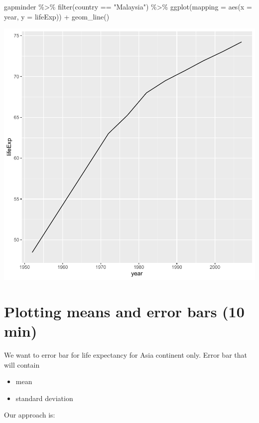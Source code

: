 \documentclass[
]{book}
\makeatletter
\newenvironment{Shaded}{\begin{snugshade}}{\end{snugshade}}
\newcommand{\AttributeTok}[1]{\textcolor[rgb]{0.61,0.61,0.61}{#1}}
\newcommand{\FunctionTok}[1]{\textcolor[rgb]{0,0,0}{#1}}
\newcommand{\NormalTok}[1]{#1}
\newcommand{\SpecialCharTok}[1]{\textcolor[rgb]{0,0,0}{#1}}
\newcommand{\StringTok}[1]{\textcolor[rgb]{0.5,0.5,0.5}{#1}}
\providecommand{\tightlist}{%
  \setlength{\itemsep}{0pt}\setlength{\parskip}{0pt}}
\newenvironment{kframe}{%
\medskip{}
\setlength{\fboxsep}{.8em}
 \def\at@end@of@kframe{}%
 \ifinner\ifhmode%
  \def\at@end@of@kframe{\end{minipage}}%
  \begin{minipage}{\columnwidth}%
 \fi\fi%
 \def\FrameCommand##1{\hskip\@totalleftmargin \hskip-\fboxsep
 \colorbox{shadecolor}{##1}\hskip-\fboxsep
     \hskip-\linewidth \hskip-\@totalleftmargin \hskip\columnwidth}%
 \MakeFramed {\advance\hsize-\width
   \@totalleftmargin\z@ \linewidth\hsize
   \@setminipage}}%
 {\par\unskip\endMakeFramed%
 \at@end@of@kframe}
\renewenvironment{Shaded}{\begin{kframe}}{\end{kframe}}
\makeatother
\begin{document}
\begin{Shaded}
\begin{Highlighting}[]
\NormalTok{gapminder }\SpecialCharTok{\%\textgreater{}\%} \FunctionTok{filter}\NormalTok{(country }\SpecialCharTok{==} \StringTok{"Malaysia"}\NormalTok{) }\SpecialCharTok{\%\textgreater{}\%}
  \FunctionTok{ggplot}\NormalTok{(}\AttributeTok{mapping =} \FunctionTok{aes}\NormalTok{(}\AttributeTok{x =}\NormalTok{ year, }\AttributeTok{y =}\NormalTok{ lifeExp)) }\SpecialCharTok{+}
  \FunctionTok{geom\_line}\NormalTok{()}
\end{Highlighting}
\end{Shaded}

\begin{center}\includegraphics[width=0.7\linewidth,keepaspectratio]{Multivariable_Data_Analysis_files/figure-latex/unnamed-chunk-91-1} \end{center}

\hypertarget{plotting-means-and-error-bars-10-min}{%
\section{Plotting means and error bars (10 min)}\label{plotting-means-and-error-bars-10-min}}

We want to error bar for life expectancy for Asia continent only. Error bar that will contain

\begin{itemize}
\tightlist
\item
  mean
\item
  standard deviation
\end{itemize}

Our approach is:
\end{document}
